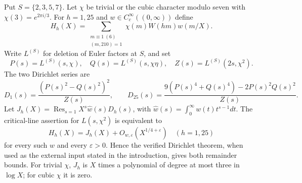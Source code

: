\begin{theorem}
\label{thm:two-shell-counts}
Put $S=\{2,3,5,7\}$. Let $\chi$ be trivial or the cubic character
modulo seven with $\chi(3)=e^{2\pi i/3}$. For $h=1,25$ and
$w\in C_c^\infty((0,\infty))$ define
\[
 H_h(X)=\sum_{\substack{m\equiv1\ (6)\\(m,210)=1}}
               \chi(m)W(hm)w(m/X).
\]
Write $L^{(S)}$ for deletion of Euler factors at $S$, and set
\[
 P(s)=L^{(S)}(s,\chi),\quad Q(s)=L^{(S)}(s,\chi\eta),
 \quad Z(s)=L^{(S)}(2s,\chi^2).
\]
The two Dirichlet series are
\begin{equation}\label{eq:shell-numerators}
 D_1(s)=\frac{(P(s)^2-Q(s)^2)^2}{Z(s)},\qquad
 D_{25}(s)=\frac{9(P(s)^4+Q(s)^4)-2P(s)^2Q(s)^2}{Z(s)}.
\end{equation}
Let $J_h(X)=\operatorname*{Res}_{s=1}
X^s\widehat w(s)D_h(s)$, with
$\widehat w(s)=\int_0^\infty w(t)t^{s-1}dt$.
The critical-line assertion for $L(s,\chi^2)$ is equivalent to
\begin{equation}\label{eq:shell-quarter-power}
 H_h(X)=J_h(X)+O_{w,\varepsilon}(X^{1/4+\varepsilon})
 \quad(h=1,25)
\end{equation}
for every such $w$ and every $\varepsilon>0$.
Hence the verified Dirichlet theorem, when used as the external
input stated in the introduction, gives both remainder bounds.
For trivial $\chi$, $J_h$ is $X$ times a polynomial of degree at
most three in $\log X$; for cubic $\chi$ it is zero.
\end{theorem}

